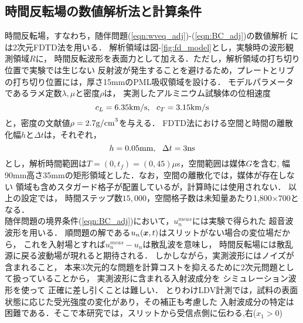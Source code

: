 \subsection{時間反転場の数値解析法と計算条件}
時間反転場，すなわち，随伴問題(\ref{eqn:wveq_adj})-(\ref{eqn:BC_adj})の数値解析
には2次元FDTD法\cite{Fellinger1995, FDTD_KK}を用いる．
解析領域は図-\ref{fig:fd_model}とし，実験時の波形観測領域$R$に，
時間反転波形を表面力として加える．ただし，解析領域の打ち切り位置で実験では生じない
反射波が発生することを避けるため，プレートとリブの打ち切り位置には，厚さ15mmのPML吸収領域を設ける．
モデルパラメータであるラメ定数$\lambda,\mu$と密度$\rho$は，
実測したアルミニウム試験体の位相速度
\begin{equation}
	c_L=6.35{\rm km/s}, \ \ c_T=3.15{\rm km/s}
	\label{eqn:phase_vels}
\end{equation}
と，密度の文献値$\rho=2.7{\rm g/cm}^3$を与える．
FDTD法における空間と時間の離散化幅$h$と$\Delta t$は，それぞれ，
\begin{equation}
	h=0.05{\rm mm}, \ \ \Delta t=3{\rm ns}
	\label{eqn:}
\end{equation}
とし，解析時間範囲は$T=(0,t_f)=(0,45)\mu$s，空間範囲は媒体$G$を含む,
幅90mm高さ35mmの矩形領域とした．なお，空間の離散化では，媒体が存在しない
領域も含めスタガード格子が配置しているが，計算時には使用されない．
以上の設定では，
時間ステップ数$15,000$，空間格子数は未知量あたり1,800$\times$700となる．
%
%
\\
\hspace{\parindent}
随伴問題の境界条件(\ref{eqn:BC_adj})において，$u_n^{meas}$には実験で得られた
超音波波形を用いる．
順問題の解である$u_n(\boldsymbol{x},t)$はスリットがない場合の変位場だから，
これを入射場とすれば$u_n^{meas}-u_n$は散乱波を意味し，
時間反転場には散乱源に戻る波動場が現れると期待される．
%
しかしながら，実測波形にはノイズが含まれること，
本来3次元的な問題を計算コストを抑えるために2次元問題として扱っていることから，
実測波形に含まれる入射波成分を
%
シミュレーション波形を使って
%
正確に差し引くことは難しい．
とりわけLDV計測では，試料の表面状態に応じた受光強度の変化があり，その補正も考慮した
入射波成分の特定は困難である．そこで本研究では，スリットから受信点側に伝わる,右($x_1>0$)
